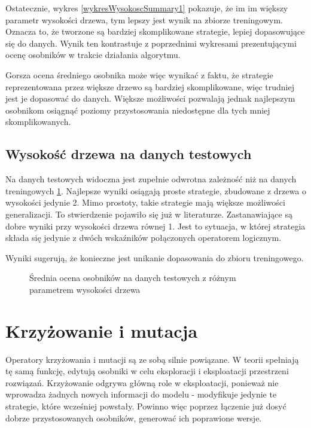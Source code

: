 \documentclass[twoside]{iisthesis}
\begin{document}
Ostatecznie, wykres \ref{wykresWysokoscSummary1} pokazuje, że im im większy parametr wysokości drzewa, tym lepszy jest wynik na zbiorze treningowym. Oznacza to, że tworzone są bardziej skomplikowane strategie, lepiej dopasowujące się do danych. Wynik ten kontrastuje z poprzednimi wykresami prezentującymi ocenę osobników w trakcie działania algorytmu. 

Gorsza ocena średniego osobnika może więc wynikać z faktu, że strategie reprezentowana przez większe drzewo są bardziej skomplikowane, więc trudniej jest je dopasować do danych. Większe możliwości pozwalają jednak najlepszym osobnikom osiągnąć poziomy przystosowania niedostępne dla tych mniej skomplikowanych.

\subsection{Wysokość drzewa na danych testowych}

Na danych testowych widoczna jest zupełnie odwrotna zależność niż na danych treningowych \ref{wykresWysokoscSummary2}. Najlepsze wyniki osiągają proste strategie, zbudowane z drzewa o wysokości jedynie 2. Mimo prostoty, takie strategie mają większe możliwości generalizacji. To stwierdzenie pojawiło się już w literaturze. Zastanawiające są dobre wyniki przy wysokości drzewa równej 1. Jest to sytuacja, w której strategia składa się jedynie z dwóch wskaźników połączonych operatorem logicznym.

Wyniki sugerują, że konieczne jest unikanie dopasowania do zbioru treningowego.

\begin{figure}[h]
\caption{Średnia ocena osobników na danych testowych z różnym parametrem wysokości drzewa}
\centering
\label{wykresWysokoscSummary2}
\end{figure}


\section{Krzyżowanie i mutacja}

Operatory krzyżowania i mutacji są ze sobą silnie powiązane. W teorii spełniają tę samą funkcję, edytują osobniki w celu eksploracji i eksploatacji przestrzeni rozwiązań. Krzyżowanie odgrywa główną role w eksploatacji, ponieważ nie wprowadza żadnych nowych informacji do modelu - modyfikuje jedynie te strategie, które wcześniej powstały. Powinno więc poprzez łączenie już dosyć dobrze przystosowanych osobników, generować ich poprawione wersje. 
\end{document}

